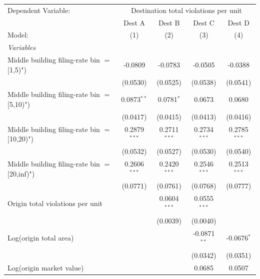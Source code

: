 \begingroup
\centering
\begin{tabular}{lcccc}
   \tabularnewline \midrule \midrule
   Dependent Variable: & \multicolumn{4}{c}{Destination total violations per unit}\\
                                                  & Dest A         & Dest B         & Dest C         & Dest D \\   
   Model:                                         & (1)            & (2)            & (3)            & (4)\\  
   \midrule
   \emph{Variables}\\
   Middle building filing-rate bin $=$ [1,5)")    & -0.0809        & -0.0783        & -0.0505        & -0.0388\\   
                                                  & (0.0530)       & (0.0525)       & (0.0538)       & (0.0541)\\   
   Middle building filing-rate bin $=$ [5,10)")   & 0.0873$^{**}$  & 0.0781$^{*}$   & 0.0673         & 0.0680\\   
                                                  & (0.0417)       & (0.0415)       & (0.0413)       & (0.0416)\\   
   Middle building filing-rate bin $=$ [10,20)")  & 0.2879$^{***}$ & 0.2711$^{***}$ & 0.2734$^{***}$ & 0.2785$^{***}$\\   
                                                  & (0.0532)       & (0.0527)       & (0.0530)       & (0.0540)\\   
   Middle building filing-rate bin $=$ [20,inf)") & 0.2606$^{***}$ & 0.2420$^{***}$ & 0.2546$^{***}$ & 0.2513$^{***}$\\   
                                                  & (0.0771)       & (0.0761)       & (0.0768)       & (0.0777)\\   
   Origin total violations per unit               &                & 0.0604$^{***}$ & 0.0555$^{***}$ &   \\   
                                                  &                & (0.0039)       & (0.0040)       &   \\   
   Log(origin total area)                         &                &                & -0.0871$^{**}$ & -0.0676$^{*}$\\   
                                                  &                &                & (0.0342)       & (0.0351)\\   
   Log(origin market value)                       &                &                & 0.0685         & 0.0507\\   

\end{tabular}
